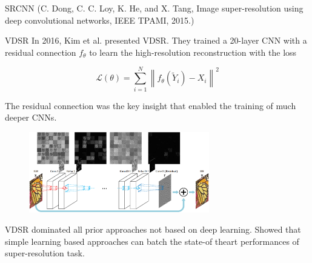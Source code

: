 \begin{frame}[allowframebreaks]
\begin{mydefinitionblock}{8.6}{SRCNN}
    (C. Dong, C. C. Loy, K. He, and X. Tang, Image super-resolution using deep convolutional networks, IEEE TPAMI, 2015.)
\end{mydefinitionblock}

\end{frame}

\begin{frame}[allowframebreaks]

\begin{mydefinitionblock}{8.7}{VDSR}
    In 2016, Kim et al. presented VDSR. They trained a 20-layer CNN with a residual connection $f_{\theta}$ to learn the high-resolution reconstruction with the loss

    $$
    \mathcal{L}(\theta)=\sum_{i=1}^{N}\left\|f_{\theta}\left(\tilde{Y}_{i}\right)-X_{i}\right\|^{2}
    $$

    The residual connection was the key insight that enabled the training of much deeper CNNs.

    \begin{figure}[H]
        \centering
        \includegraphics[width=0.7\textwidth]{.././assets/8.5.png}
    \end{figure}

    \par\noindent\textcolor{gray}{\hdashrule{\textwidth}{0.4pt}{1pt 2pt}}

    VDSR dominated all prior approaches not based on deep learning.
    Showed that simple learning based approaches can batch the state-of theart performances of super-resolution task.


\end{mydefinitionblock}
\end{frame}
